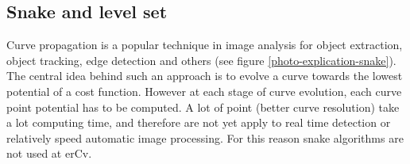 \subsection{Snake and level set}
\label{snake-and-level-set}
 
Curve propagation is a popular technique in image analysis for object extraction, object tracking, edge detection and others (see figure \ref{photo-explication-snake}). The central idea behind such an approach is to evolve a curve towards the lowest potential of a cost function. However at each stage of curve evolution, each curve point potential has to be computed. A lot of point (better curve resolution) take a lot computing time, and therefore are not yet apply to real time detection or relatively speed automatic image processing. For this reason snake algorithms are not used at erCv.

